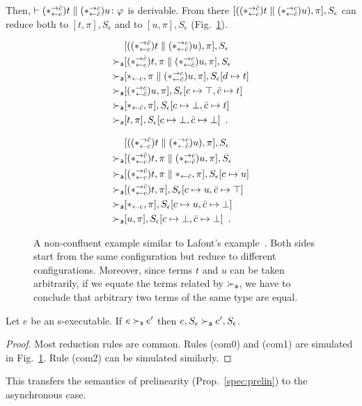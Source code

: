 Then,
$\vdash{(\ast^{\rightarrow {\bar{c}}}_{\leftarrow{c}})t\parallel(\ast^{\rightarrow {c}}_{\leftarrow{\bar{c}}})u} \colon{\varphi}$ is derivable.
From there $[((\ast^{\rightarrow {\bar{c}}}_{\leftarrow{c}})t\parallel (\ast^{\rightarrow {c}}_{\leftarrow{\bar{c}}})u),
\pi],S_\epsilon$
can reduce both to $[t,\pi], S_\epsilon$
and to $[u,\pi], S_\epsilon$ (Fig.~\ref{fig:lafont}).
\begin{figure}
 \begin{subfigure}[b]{0.45\textwidth}
  \begin{align*}
   & [((\ast^{\rightarrow {\bar{c}}}_{\leftarrow{c}})t\parallel (\ast^{\rightarrow {c}}_{\leftarrow{\bar{c}}}) u),\pi], S_\epsilon \\
   \succ_{\mathsf a} & [(\ast^{\rightarrow {\bar{c}}}_{\leftarrow{c}})t,\pi\parallel (\ast^{\rightarrow {c}}_{\leftarrow{\bar{c}}})u,\pi], S_\epsilon \\
   \succ_{\mathsf a} & [\ast_{\leftarrow{c}}, \pi\parallel (\ast^{\rightarrow {c}}_{\leftarrow{\bar{c}}})u,\pi], S_\epsilon[d\mapsto
   t] \\
   \succ_{\mathsf a} & [(\ast^{\rightarrow {c}}_{\leftarrow{\bar{c}}})u,\pi], S_\epsilon[c\mapsto \top, \bar{c}\mapsto t] \\
   \succ_{\mathsf a} & [\ast_{\leftarrow{\bar{c}}}, \pi], S_\epsilon[c\mapsto \bot, \bar{c}\mapsto t] \\
   \succ_{\mathsf a} & [t,\pi], S_\epsilon[c\mapsto \bot,\bar{c}\mapsto \bot]\enspace.
  \end{align*}
 \end{subfigure}
 \begin{subfigure}[b]{0.45\textwidth}
  \begin{align*}
   & [((\ast^{\rightarrow {\bar{c}}}_{\leftarrow{c}})t\parallel (\ast^{\rightarrow {c}}_{\leftarrow{\bar{c}}}) u),\pi], S_\epsilon \\
   \succ_{\mathsf a} & [(\ast^{\rightarrow {\bar{c}}}_{\leftarrow{c}})t,\pi\parallel (\ast^{\rightarrow {c}}_{\leftarrow{\bar{c}}})u,\pi], S_\epsilon \\
   \succ_{\mathsf a} & [(\ast^{\rightarrow {\bar{c}}}_{\leftarrow{c}})t,\pi\parallel \ast_{\leftarrow{\bar{c}}},\pi], S_\epsilon[c\mapsto u] \\
   \succ_{\mathsf a} & [(\ast^{\rightarrow {\bar{c}}}_{\leftarrow{c}})t,\pi], S_\epsilon[c\mapsto u, \bar{c}\mapsto \top] \\
   \succ_{\mathsf a} & [\ast_{\leftarrow{c}},\pi], S_\epsilon[c\mapsto u,\bar{c}\mapsto \bot] \\
   \succ_{\mathsf a} & [u,\pi], S_\epsilon[c\mapsto \bot,\bar{c}\mapsto \bot]\enspace.
  \end{align*}
 \end{subfigure}
 \caption[A non-confluent example similar to Lafont's example.]
 {A non-confluent example similar to Lafont's example~\citep[B.1]{girard1989proofs}.  Both sides start
 from the same configuration but reduce to different configurations.
 Moreover, since terms $t$ and $u$ can be taken arbitrarily, if we
 equate the terms related by $\succ_{\mathsf a}$, we have to conclude that arbitrary
 two terms of the same type are equal.}
 \label{fig:lafont}
\end{figure}

\begin{proposition}
 Let $e$ be an s-executable.
 If $e\succ_{\mathsf s} e'$ then $e, S_\epsilon \succ_{\mathsf a} e', S_\epsilon$.
\end{proposition}
\begin{proof}
 Most reduction rules are common.  Rules (com0) and (com1) are
 simulated in Fig.~\ref{fig:lafont}.  Rule (com2) can be simulated similarly.
\end{proof}
This transfers the semantics of prelinearity (Prop.~\ref{spec:prelin}) to the asynchronous case.


